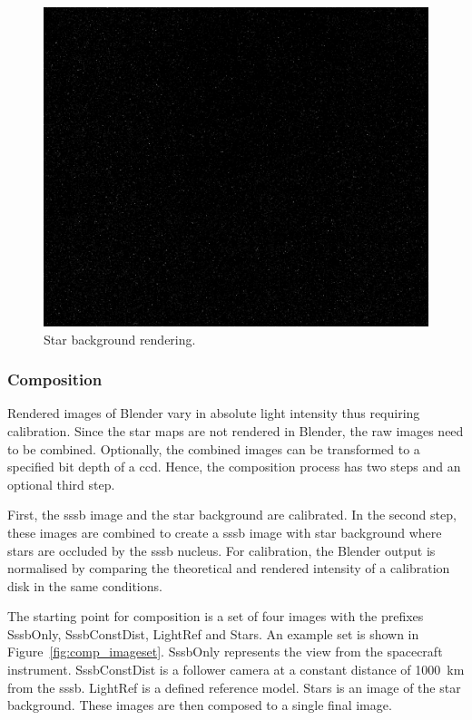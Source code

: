 \begin{figure}[htb]
    \centering
    \includegraphics[width=\textwidth]{doc/thesis/0_figures/star_rendering/Stars_2017-08-15T115856-171000.png}
    \caption{Star background rendering.}
    \label{fig:star_rendering}
\end{figure}

\subsubsection{Composition} \label{sec:composition}
Rendered images of Blender vary in absolute light intensity thus requiring calibration. Since the star maps are not rendered in Blender, the raw images need to be combined. Optionally, the combined images can be transformed to a specified bit depth of a \gls{ccd}. Hence, the composition process has two steps and an optional third step. 

First, the \gls{sssb} image and the star background are calibrated. In the second step, these images are combined to create a \gls{sssb} image with star background where stars are occluded by the \gls{sssb} nucleus. For calibration, the Blender output is normalised by comparing the theoretical and rendered intensity of a calibration disk in the same conditions.

The starting point for composition is a set of four images with the prefixes SssbOnly, SssbConstDist, LightRef and Stars. An example set is shown in Figure~\ref{fig:comp_imageset}. SssbOnly represents the view from the spacecraft instrument. SssbConstDist is a follower camera at a constant distance of \SI{1000}{\kilo\meter} from the \gls{sssb}. LightRef is a defined reference model. Stars is an image of the star background. These images are then composed to a single final image.

